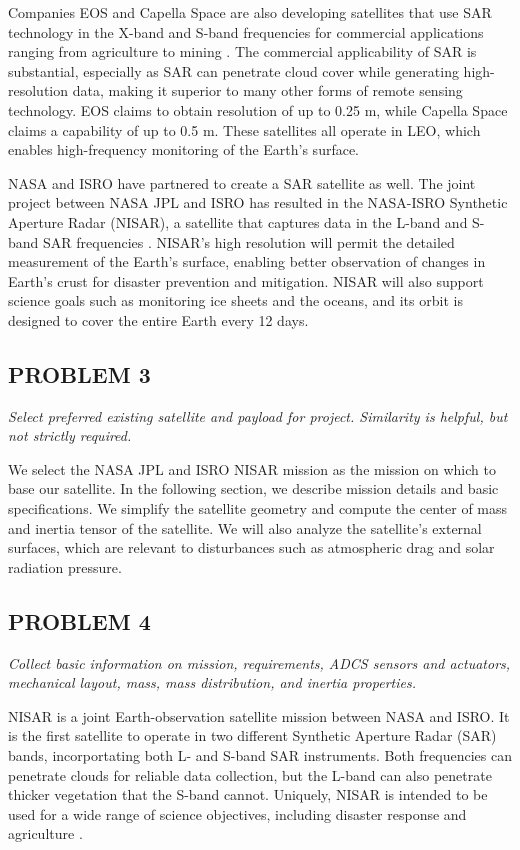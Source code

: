 Companies EOS and Capella Space are also developing satellites that use SAR technology in the X-band and S-band frequencies for commercial applications ranging from agriculture to mining \cite{EOSSAR, Capella}. The commercial applicability of SAR is substantial, especially as SAR can penetrate cloud cover while generating high-resolution data, making it superior to many other forms of remote sensing technology. EOS claims to obtain resolution of up to 0.25 m, while Capella Space claims a capability of up to 0.5 m. These satellites all operate in LEO, which enables high-frequency monitoring of the Earth's surface.

NASA and ISRO have partnered to create a SAR satellite as well. The joint project between NASA JPL and ISRO has resulted in the NASA-ISRO Synthetic Aperture Radar (NISAR), a satellite that captures data in the L-band and S-band SAR frequencies \cite{NISARMission}. NISAR's high resolution will permit the detailed measurement of the Earth's surface, enabling better observation of changes in Earth's crust for disaster prevention and mitigation. NISAR will also support science goals such as monitoring ice sheets and the oceans, and its orbit is designed to cover the entire Earth every 12 days.

\subsection{PROBLEM 3}
\textit{Select preferred existing satellite and payload for project. Similarity is helpful, but not strictly required.}

We select the NASA JPL and ISRO NISAR mission as the mission on which to base our satellite. In the following section, we describe mission details and basic specifications. We simplify the satellite geometry and compute the center of mass and inertia tensor of the satellite. We will also analyze the satellite's external surfaces, which are relevant to disturbances such as atmospheric drag and solar radiation pressure.

\subsection{PROBLEM 4}
\textit{Collect basic information on mission, requirements, ADCS sensors and actuators, mechanical layout, mass, mass distribution, and inertia properties.}

NISAR is a joint Earth-observation satellite mission between NASA and ISRO. It is the first satellite to operate in two different Synthetic Aperture Radar (SAR) bands, incorportating both L- and S-band SAR instruments. Both frequencies can penetrate clouds for reliable data collection, but the L-band can also penetrate thicker vegetation that the S-band cannot. Uniquely, NISAR is intended to be used for a wide range of science objectives, including disaster response and agriculture \cite{NISARApps}.

